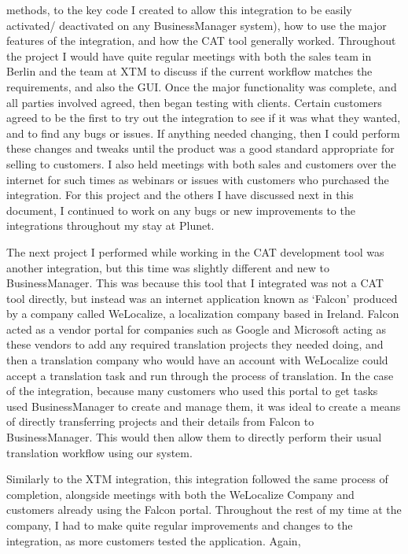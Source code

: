 \documentclass[12pt]{article}
\begin{document}
methods, to the key code I created to allow this integration to be easily activated/ deactivated on any BusinessManager
system), how to use the major features of the integration, and how the CAT tool generally worked. Throughout the project
I would have quite regular meetings with both the sales team in Berlin and the team at XTM to discuss if the current
workflow matches the requirements, and also the GUI. Once the major functionality was complete, and all parties involved
agreed, then began testing with clients. Certain customers agreed to be the first to try out the integration to see if
it was what they wanted, and to find any bugs or issues. If anything needed changing, then I could perform these changes
and tweaks until the product was a good standard appropriate for selling to customers. I also held meetings with both
sales and customers over the internet for such times as webinars or issues with customers who purchased the integration.
For this project and the others I have discussed next in this document, I continued to work on any bugs or new
improvements to the integrations throughout my stay at Plunet.\\ \par \noindent
The next project I performed while working in the CAT development tool was another integration, but this time was
slightly different and new to BusinessManager. This was because this tool that I integrated was not a CAT tool directly,
but instead was an internet application known as ‘Falcon’ produced by a company called WeLocalize, a localization
company based in Ireland. Falcon acted as a vendor portal for companies such as Google and Microsoft acting as these
vendors to add any required translation projects they needed doing, and then a translation company who would have an
account with WeLocalize could accept a translation task and run through the process of translation. In the case of the
integration, because many customers who used this portal to get tasks used BusinessManager to create and manage them, it
was ideal to create a means of directly transferring projects and their details from Falcon to BusinessManager. This
would then allow them to directly perform their usual translation workflow using our system.\\ \par \noindent
Similarly to the XTM integration, this integration followed the same process of completion, alongside meetings with both
the WeLocalize Company and customers already using the Falcon portal. Throughout the rest of my time at the company, I
had to make quite regular improvements and changes to the integration, as more customers tested the application. Again,
\end{document}
